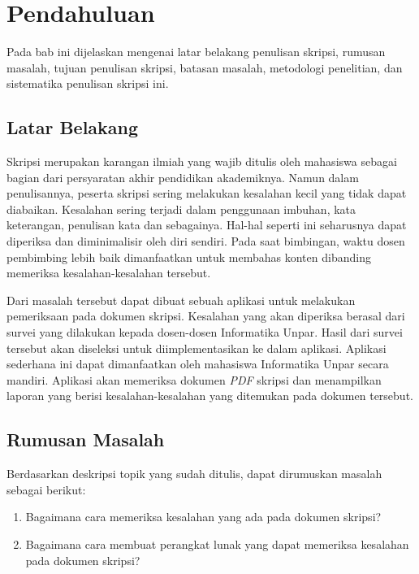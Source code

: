 \chapter{Pendahuluan}
\label{chap:intro}
   
Pada bab ini dijelaskan mengenai latar belakang penulisan skripsi, rumusan masalah, tujuan penulisan skripsi, batasan masalah, metodologi penelitian, dan sistematika penulisan skripsi ini.

\section{Latar Belakang}
\label{sec:label}

Skripsi merupakan karangan ilmiah yang wajib ditulis oleh mahasiswa sebagai bagian dari persyaratan akhir pendidikan akademiknya. Namun dalam penulisannya, peserta skripsi sering melakukan kesalahan kecil yang tidak dapat diabaikan. Kesalahan sering terjadi dalam penggunaan imbuhan, kata keterangan, penulisan kata dan sebagainya. Hal-hal seperti ini seharusnya dapat diperiksa dan diminimalisir oleh diri sendiri. Pada saat bimbingan, waktu dosen pembimbing lebih baik dimanfaatkan untuk membahas konten dibanding memeriksa kesalahan-kesalahan tersebut. 

Dari masalah tersebut dapat dibuat sebuah aplikasi untuk melakukan pemeriksaan pada dokumen skripsi. Kesalahan yang akan diperiksa berasal dari survei yang dilakukan kepada dosen-dosen Informatika Unpar. Hasil dari survei tersebut akan diseleksi untuk diimplementasikan ke dalam aplikasi. Aplikasi sederhana ini dapat dimanfaatkan oleh mahasiswa Informatika Unpar secara mandiri. Aplikasi akan memeriksa dokumen \textit{PDF} skripsi dan menampilkan laporan yang berisi kesalahan-kesalahan yang ditemukan pada dokumen tersebut. 

\section{Rumusan Masalah}
\label{sec:rumusan}
Berdasarkan deskripsi topik yang sudah ditulis, dapat dirumuskan masalah sebagai berikut:
\begin{enumerate}
	\item Bagaimana cara memeriksa kesalahan yang ada pada dokumen skripsi?
	\item Bagaimana cara membuat perangkat lunak yang dapat memeriksa kesalahan pada dokumen skripsi?
\end{enumerate}

